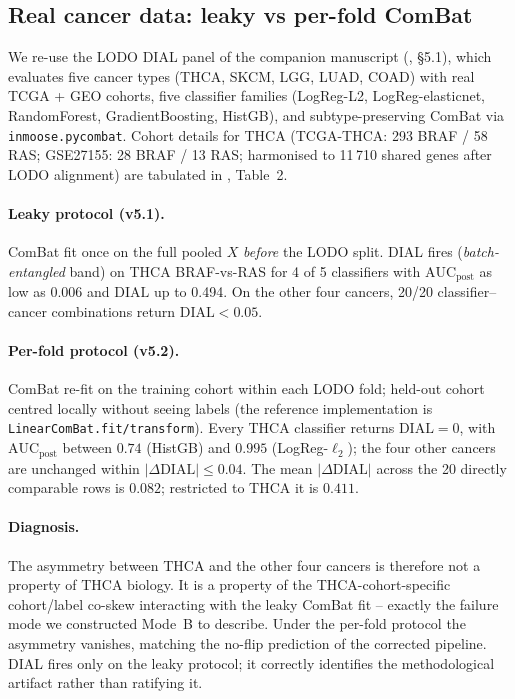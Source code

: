 \documentclass[letterpaper,11pt]{article}
\begin{document}
\subsection{Real cancer data: leaky vs per-fold ComBat}
\label{sec:real}
We re-use the LODO DIAL panel of the companion manuscript
(\cite{thcadash_bioinfo_2026}, §5.1), which evaluates five cancer
types (THCA, SKCM, LGG, LUAD, COAD) with real TCGA + GEO cohorts, five
classifier families (LogReg-L2, LogReg-elasticnet, RandomForest,
GradientBoosting, HistGB), and subtype-preserving ComBat via
\texttt{inmoose.pycombat}. Cohort details for THCA
(TCGA-THCA: 293 BRAF / 58 RAS; GSE27155: 28 BRAF / 13 RAS;
harmonised to 11\,710 shared genes after LODO alignment) are
tabulated in \cite{thcadash_bioinfo_2026}, Table~2.

\paragraph{Leaky protocol (v5.1).}
ComBat fit once on the full pooled $X$ \emph{before} the LODO split.
DIAL fires (\emph{batch-entangled} band) on THCA BRAF-vs-RAS for 4 of
5 classifiers with $\mathrm{AUC}_{\mathrm{post}}$ as low as 0.006 and
$\mathrm{DIAL}$ up to 0.494. On the other four cancers, 20/20
classifier--cancer combinations return $\mathrm{DIAL}<0.05$.

\paragraph{Per-fold protocol (v5.2).}
ComBat re-fit on the training cohort within each LODO fold; held-out
cohort centred locally without seeing labels (the reference
implementation is \texttt{LinearComBat.fit/transform}). Every
THCA classifier returns $\mathrm{DIAL} = 0$, with
$\mathrm{AUC}_{\mathrm{post}}$ between $0.74$ (HistGB) and $0.995$
(LogReg-$\ell_2$); the four other cancers are unchanged within
$|\Delta\mathrm{DIAL}| \le 0.04$. The mean $|\Delta\mathrm{DIAL}|$
across the 20 directly comparable rows is $0.082$; restricted to
THCA it is $0.411$.

\paragraph{Diagnosis.}
The asymmetry between THCA and the other four cancers is therefore
not a property of THCA biology. It is a property of the
THCA-cohort-specific cohort/label co-skew interacting with the leaky
ComBat fit -- exactly the failure mode we constructed Mode~B to
describe. Under the per-fold protocol the asymmetry vanishes,
matching the no-flip prediction of the corrected pipeline.
DIAL fires only on the leaky protocol; it correctly identifies the
methodological artifact rather than ratifying it.
\end{document}
